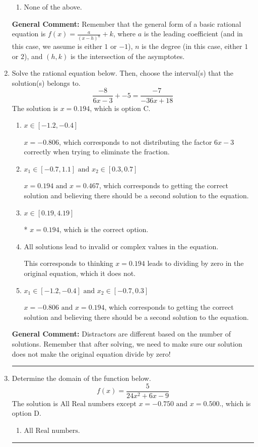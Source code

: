 \documentclass{extbook}[14pt]
\newcommand{\litem}[1]{\item #1

\rule{\textwidth}{0.4pt}}
\begin{document}
\begin{enumerate}
{\begin{enumerate}[label=\Alph*.]
\begin{multicols}{2}
\end{multicols}\item None of the above.\end{enumerate}
\textbf{General Comment:} Remember that the general form of a basic rational equation is $ f(x) = \frac{a}{(x-h)^n} + k$, where $a$ is the leading coefficient (and in this case, we assume is either $1$ or $-1$), $n$ is the degree (in this case, either $1$ or $2$), and $(h, k)$ is the intersection of the asymptotes.
}
\litem{
Solve the rational equation below. Then, choose the interval(s) that the solution(s) belongs to.
\[ \frac{-8}{6x -3} + -5 = \frac{-7}{-36x + 18} \]The solution is \( x = 0.194 \), which is option C.\begin{enumerate}[label=\Alph*.]
\item \( x \in [-1.2,-0.4] \)

$x = -0.806$, which corresponds to not distributing the factor $6x -3$ correctly when trying to eliminate the fraction.
\item \( x_1 \in [-0.7, 1.1] \text{ and } x_2 \in [0.3,0.7] \)

$x = 0.194 \text{ and } x = 0.467$, which corresponds to getting the correct solution and believing there should be a second solution to the equation.
\item \( x \in [0.19,4.19] \)

* $x = 0.194$, which is the correct option.
\item \( \text{All solutions lead to invalid or complex values in the equation.} \)

This corresponds to thinking $x = 0.194$ leads to dividing by zero in the original equation, which it does not.
\item \( x_1 \in [-1.2, -0.4] \text{ and } x_2 \in [-0.7,0.3] \)

$x = -0.806 \text{ and } x = 0.194$, which corresponds to getting the correct solution and believing there should be a second solution to the equation.
\end{enumerate}

\textbf{General Comment:} Distractors are different based on the number of solutions. Remember that after solving, we need to make sure our solution does not make the original equation divide by zero!
}
\litem{
Determine the domain of the function below.
\[ f(x) = \frac{5}{24x^{2} +6 x -9} \]The solution is \( \text{All Real numbers except } x = -0.750 \text{ and } x = 0.500. \), which is option D.\begin{enumerate}[label=\Alph*.]
\item \( \text{All Real numbers.} \)


\end{enumerate}}
\end{enumerate}
\end{document}
